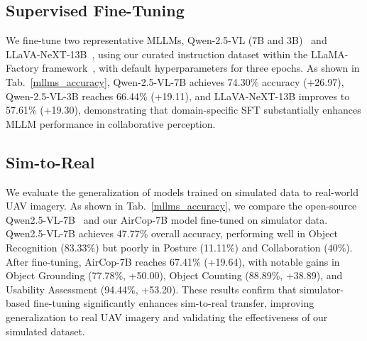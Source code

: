 \documentclass[letterpaper]{article} %
\begin{document}
\subsection{Supervised Fine-Tuning}
We fine-tune two representative MLLMs, Qwen-2.5-VL (7B and 3B)~\cite{bai2025qwen2} and LLaVA-NeXT-13B~\cite{liu2024llavanext}, using our curated instruction dataset within the LLaMA-Factory framework~\cite{zheng2024llamafactory}, with default hyperparameters for three epochs. As shown in Tab.~\ref{mllms_accuracy}, Qwen-2.5-VL-7B achieves 74.30\% accuracy (+26.97), Qwen-2.5-VL-3B reaches 66.44\% (+19.11), and LLaVA-NeXT-13B improves to 57.61\% (+19.30), demonstrating that domain-specific SFT substantially enhances MLLM performance in collaborative perception.



\subsection{Sim-to-Real}
We evaluate the generalization of models trained on simulated data to real-world UAV imagery. As shown in Tab.~\ref{mllms_accuracy}, we compare the open-source Qwen2.5-VL-7B~\cite{bai2025qwen2} and our AirCop-7B model fine-tuned on simulator data. Qwen2.5-VL-7B achieves 47.77\% overall accuracy, performing well in Object Recognition (83.33\%) but poorly in Posture (11.11\%) and Collaboration (40\%). After fine-tuning, AirCop-7B reaches 67.41\% (+19.64), with notable gains in Object Grounding (77.78\%, +50.00), Object Counting (88.89\%, +38.89), and Usability Assessment (94.44\%, +53.20). These results confirm that simulator-based fine-tuning significantly enhances sim-to-real transfer, improving generalization to real UAV imagery and validating the effectiveness of our simulated dataset.
\end{document}

